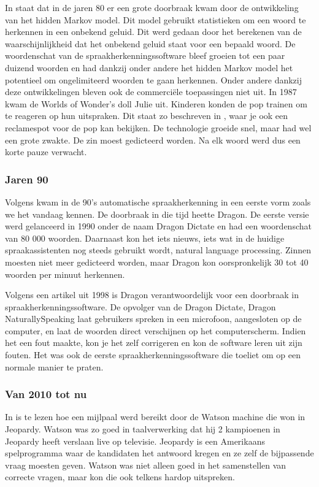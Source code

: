 In \autocite{Pinola2011} staat dat in de jaren 80 er een grote doorbraak kwam door de ontwikkeling van het hidden Markov model. Dit model gebruikt statistieken om een woord te herkennen in een onbekend geluid. Dit werd gedaan door het berekenen van de waarschijnlijkheid dat het onbekend geluid staat voor een bepaald woord. De woordenschat van de spraakherkenningssoftware bleef groeien tot een paar duizend woorden en had dankzij onder andere het hidden Markov model het potentieel om ongelimiteerd woorden te gaan herkennen.
Onder andere dankzij deze ontwikkelingen bleven ook de commerciële toepassingen niet uit. In 1987 kwam de Worlds of Wonder's doll Julie uit. Kinderen konden de pop trainen om te reageren op hun uitspraken. Dit staat zo beschreven in \autocite{Pinola2011}, waar je ook een reclamespot voor de pop kan bekijken. De technologie groeide snel, maar had wel een grote zwakte. De zin moest gedicteerd worden. Na elk woord werd dus een korte pauze verwacht.

\subsubsection{Jaren 90}
Volgens \autocite{Kincaid2018} kwam in de 90's automatische spraakherkenning in een eerste vorm zoals we het vandaag kennen. De doorbraak in die tijd heette Dragon. De eerste versie werd gelanceerd in 1990 onder de naam Dragon Dictate en had een woordenschat van 80 000 woorden. Daarnaast kon het iets nieuws, iets wat in de huidige spraakassistenten nog steeds gebruikt wordt, natural language processing. Zinnen moesten niet meer gedicteerd worden, maar Dragon kon oorspronkelijk 30 tot 40 woorden per minuut herkennen.

Volgens een artikel uit 1998 \autocite{Puri1998} is Dragon verantwoordelijk voor een doorbraak in spraakherkenningssoftware. De opvolger van de Dragon Dictate, Dragon NaturallySpeaking laat gebruikers spreken in een microfoon, aangesloten op de computer, en laat de woorden direct verschijnen op het computerscherm. Indien het een fout maakte, kon je het zelf corrigeren en kon de software leren uit zijn fouten. Het was ook de eerste spraakherkenningssoftware die toeliet om op een normale manier te praten.

\subsubsection{Van 2010 tot nu}
In \autocite{IBM2011} is te lezen hoe een mijlpaal werd bereikt door de Watson machine die won in Jeopardy. Watson was zo goed in taalverwerking dat hij 2 kampioenen in Jeopardy heeft verslaan live op televisie. Jeopardy is een Amerikaans spelprogramma waar de kandidaten het antwoord kregen en ze zelf de bijpassende vraag moesten geven. Watson was niet alleen goed in het samenstellen van correcte vragen, maar kon die ook telkens hardop uitspreken.

